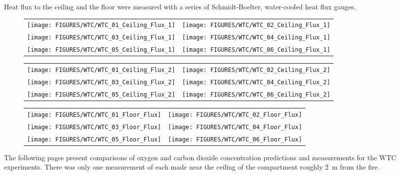 \clearpage

Heat flux to the ceiling and the floor were measured with a series of Schmidt-Boelter, water-cooled heat flux gauges.
\begin{figure}[h!]
\begin{tabular*}{\textwidth}{l@{\extracolsep{\fill}}r}
\texttt{[image: FIGURES/WTC/WTC\_01\_Ceiling\_Flux\_1]} &
\texttt{[image: FIGURES/WTC/WTC\_02\_Ceiling\_Flux\_1]} \\
\texttt{[image: FIGURES/WTC/WTC\_03\_Ceiling\_Flux\_1]} &
\texttt{[image: FIGURES/WTC/WTC\_04\_Ceiling\_Flux\_1]} \\
\texttt{[image: FIGURES/WTC/WTC\_05\_Ceiling\_Flux\_1]} &
\texttt{[image: FIGURES/WTC/WTC\_06\_Ceiling\_Flux\_1]}
\end{tabular*}
\end{figure}

\begin{figure}[p]
\begin{tabular*}{\textwidth}{l@{\extracolsep{\fill}}r}
\texttt{[image: FIGURES/WTC/WTC\_01\_Ceiling\_Flux\_2]} &
\texttt{[image: FIGURES/WTC/WTC\_02\_Ceiling\_Flux\_2]} \\
\texttt{[image: FIGURES/WTC/WTC\_03\_Ceiling\_Flux\_2]} &
\texttt{[image: FIGURES/WTC/WTC\_04\_Ceiling\_Flux\_2]} \\
\texttt{[image: FIGURES/WTC/WTC\_05\_Ceiling\_Flux\_2]} &
\texttt{[image: FIGURES/WTC/WTC\_06\_Ceiling\_Flux\_2]}
\end{tabular*}
\end{figure}

\begin{figure}[p]
\begin{tabular*}{\textwidth}{l@{\extracolsep{\fill}}r}
\texttt{[image: FIGURES/WTC/WTC\_01\_Floor\_Flux]} &
\texttt{[image: FIGURES/WTC/WTC\_02\_Floor\_Flux]} \\
\texttt{[image: FIGURES/WTC/WTC\_03\_Floor\_Flux]} &
\texttt{[image: FIGURES/WTC/WTC\_04\_Floor\_Flux]} \\
\texttt{[image: FIGURES/WTC/WTC\_05\_Floor\_Flux]} &
\texttt{[image: FIGURES/WTC/WTC\_06\_Floor\_Flux]}
\end{tabular*}
\end{figure}

\clearpage

The following pages present comparisons of oxygen and carbon dioxide concentration predictions and measurements for the WTC experiments. There was only one measurement of each made near the ceiling of the compartment roughly 2~m from the fire.


